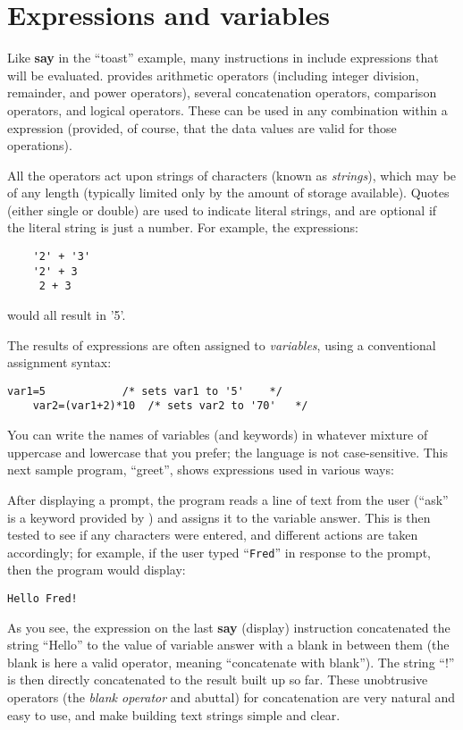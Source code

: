 \section{Expressions and variables}
Like \textbf{say} in the “toast” example, many instructions in \nr{} include expressions that will be evaluated. \nr{} provides arithmetic operators (including integer division, remainder, and power operators), several concatenation operators, comparison operators, and logical operators. These can be used in any combination within a \nr{} expression (provided, of course, that the data values are valid for those operations).

All the operators act upon strings of characters (known as \emph{\nr{}
strings}), which may be of any length (typically limited only by the
amount of storage available). Quotes (either single or double) are
used to indicate literal strings, and are optional if the literal
string is just a number. For example, the expressions:
\begin{lstlisting}
    '2' + '3'
    '2' + 3
     2 + 3
\end{lstlisting}
would all result in '5'.

The results of expressions are often assigned to \emph{variables}, using a
conventional assignment syntax:
\begin{lstlisting}[label=assignment,caption=Assignment]
    var1=5            /* sets var1 to '5'    */
    var2=(var1+2)*10  /* sets var2 to '70'   */
\end{lstlisting}
You can write the names of variables (and keywords) in whatever mixture of uppercase and lowercase that you prefer; the language is not case-sensitive.
This next sample program, “greet”, shows expressions used in various
ways:

After displaying a prompt, the program reads a line of text from the
user (“ask” is a keyword provided by \nr{}) and assigns it to the
variable answer. This is then tested to see if any characters were
entered, and different actions are taken accordingly; for example, if
the user typed “\texttt{Fred}” in response to the prompt, then the program
would display:
\begin{lstlisting}
Hello Fred!
\end{lstlisting}
As you see, the expression on the last \textbf{say} (display) instruction
concatenated the string “Hello” to the value of variable answer with a
blank in between them (the blank is here a valid operator, meaning
“concatenate with blank”). The string “!” is then directly
concatenated to the result built up so far. These unobtrusive
operators (the \emph{blank operator} and abuttal) for concatenation are very
natural and easy to use, and make building text strings simple and
clear.

